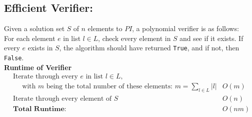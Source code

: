 \documentclass[11pt]{article}
\begin{document}
\subsection{Efficient Verifier:}
Given a solution set $S$ of $n$ elements to $PI$, a polynomial verifier is as follows:\\

For each element $e$ in list $l \in L$, check every element in $S$ and see if it exists. If every $e$ exists in $S$, the algorithm should have returned \texttt{True}, and if not, then \texttt{False}. \\

\textbf{Runtime of Verifier }
\begin{align*}
&\text{Iterate through every $e$ in list $l \in L$,}\\
&\text{$\quad$ with $m$ being the total number of these elements: $m = \sum_{l \in L} |l|$} &O(m)\\ 
&\text{Iterate through every element of $S$ } &O(n)\\ 
&\textbf{Total Runtime: } &O(nm)\\
\end{align*}

\lobsectionbreak

\vspace*{2.7cm}
\hspace*{9cm} 
 \hfill
\vspace*{-.7cm}
\end{document}
